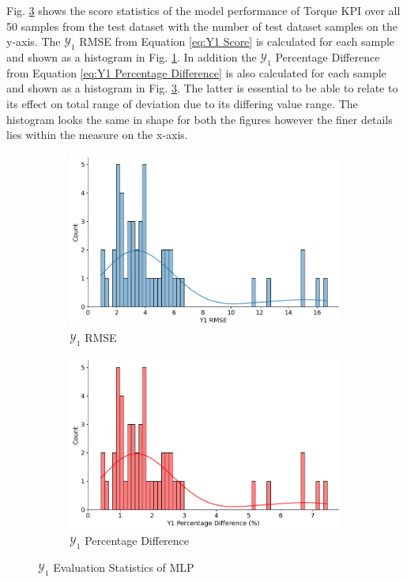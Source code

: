 \documentclass{report} %
\begin{document}
Fig. \ref{fig:Y1 Evaluation Statistics MLP} shows the score statistics of the model performance of Torque \ac{KPI} over all 50 samples from the test dataset 
with the number of test dataset samples on the y-axis.
The $\mathcal{Y}_1$ \ac{RMSE} from Equation \ref{eq:Y1 Score} is calculated for each sample and shown as a histogram in Fig. \ref{fig:Y1 RMSE}.
In addition the $\mathcal{Y}_1$ Percentage Difference from Equation \ref{eq:Y1 Percentage Difference} is also calculated for each sample and shown as a histogram in Fig. 
\ref{fig:Y1 Evaluation Statistics MLP}. The latter is essential to be able to relate to its effect on total range of deviation due to its differing value range. 
The histogram looks the same in shape for both the figures however the finer details lies within the measure on the x-axis.

\begin{figure}[H]
    \centering
    \begin{subfigure}{0.5\textwidth}
        \centering
        \includegraphics[width=\textwidth]{./ReportImages/score_MLP_y1.png}
        \caption{$\mathcal{Y}_1$ \ac{RMSE}}
        \label{fig:Y1 RMSE}
    \end{subfigure}\hfill
    \begin{subfigure}{0.5\textwidth}
        \centering
        \includegraphics[width=\textwidth]{./ReportImages/percentage_diff_MLP_y1.png}
        \caption{$\mathcal{Y}_1$ Percentage Difference}
        \label{fig:Y1 Percentage Difference}
    \end{subfigure}
    \caption{$\mathcal{Y}_1$ Evaluation Statistics of \ac{MLP}}
    \label{fig:Y1 Evaluation Statistics MLP}
\end{figure}
\end{document}
